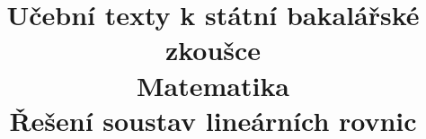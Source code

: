 \clearpage

\clearpage

\title{\LARGE Učební texty k státní bakalářské zkoušce \\ Matematika \\ Řešení soustav lineárních rovnic}



\maketitle

\newpage
\setcounter{section}{10}



